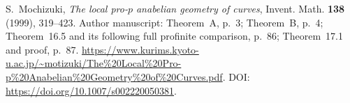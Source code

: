 S.~Mochizuki, \emph{The local pro-$p$ anabelian geometry of curves},
Invent. Math. \textbf{138} (1999), 319--423.
Author manuscript: Theorem~A, p.~3; Theorem~B, p.~4;
Theorem~16.5 and its following full profinite comparison, p.~86;
Theorem~17.1 and proof, p.~87.
\url{https://www.kurims.kyoto-u.ac.jp/~motizuki/The%20Local%20Pro-p%20Anabelian%20Geometry%20of%20Curves.pdf}.
DOI: \url{https://doi.org/10.1007/s002220050381}.
